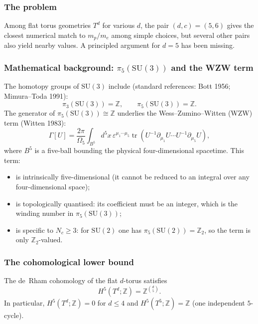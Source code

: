 \subsubsection{The problem}

Among flat torus geometries $T^d$ for various $d$, the pair $(d,c)=(5,6)$
gives the closest numerical match to $m_p/m_e$ among simple choices,
but several other pairs also yield nearby values.  A principled argument
for $d=5$ has been missing.

\subsubsection{Mathematical background: $\pi_5(\mathrm{SU}(3))$ and
the WZW term}

The homotopy groups of $\mathrm{SU}(3)$ include (standard references:
Bott 1956; Mimura--Toda 1991):
\[
  \pi_3(\mathrm{SU}(3)) = \mathbb{Z},\qquad
  \pi_5(\mathrm{SU}(3)) = \mathbb{Z}.
\]
The generator of $\pi_5(\mathrm{SU}(3))\cong\mathbb{Z}$ underlies the
Wess--Zumino--Witten (WZW) term (Witten 1983):
\[
  \Gamma[U] = \frac{2\pi}{\Omega_5}
  \int_{B^5} d^5x\,
  \varepsilon^{\mu_1\cdots\mu_5}
  \operatorname{tr}\!\left(U^{-1}\partial_{\mu_1}U\cdots
    U^{-1}\partial_{\mu_5}U\right),
\]
where $B^5$ is a five-ball bounding the physical four-dimensional
spacetime.  This term:
\begin{itemize}[leftmargin=1.5em]
  \item is intrinsically five-dimensional (it cannot be reduced to an
        integral over any four-dimensional space);
  \item is topologically quantised: its coefficient must be an integer,
        which is the winding number in $\pi_5(\mathrm{SU}(3))$;
  \item is specific to $N_c\geq 3$: for $\mathrm{SU}(2)$ one has
        $\pi_5(\mathrm{SU}(2))=\mathbb{Z}_2$, so the term is only
        $\mathbb{Z}_2$-valued.
\end{itemize}

\subsubsection{The cohomological lower bound}

\begin{lemma}
  \label{lem:h5}
  The de~Rham cohomology of the flat $d$-torus satisfies
  \[
    H^5(T^d;\mathbb{Z}) = \mathbb{Z}^{\binom{d}{5}}.
  \]
  In particular, $H^5(T^d;\mathbb{Z})=0$ for $d\leq 4$ and
  $H^5(T^5;\mathbb{Z})=\mathbb{Z}$ (one independent $5$-cycle).
\end{lemma}

